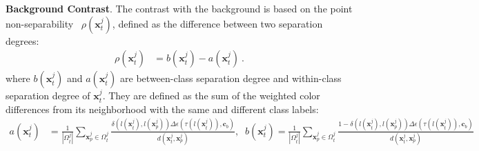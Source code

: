 %
%


\vspace{2mm}
\noindent\textbf{Background Contrast}.
The contrast with the background is based on the point non-separability~\cite{Wang2018} $\rho (\mathbf{x}^j_t)$, defined as the difference between two  separation degrees: 
\begin{align}
\rho(\mathbf{x}^j_t)&= b(\mathbf{x}^j_t)-a(\mathbf{x}^j_t) \ .
\end{align}
where $b(\mathbf{x}^j_t)$ and $a(\mathbf{x}^j_t)$ are between-class separation degree and within-class separation degree  of $\mathbf{x}^j_t$. They are defined as the sum of the weighted color differences from its neighborhood with the same and different class labels:
\begin{align}
a(\mathbf{x}^j_t)&=\frac{1}{|\Omega^j_t|}\sum_{\mathbf{x}^j_p \in \Omega^j_t } \frac{\delta(l(\mathbf{x}^j_t), l(\mathbf{x}^j_p)) 
\Delta\epsilon(\tau(l(\mathbf{x}^j_t)),\mathbf{c}_b)
}{d(\mathbf{x}^j_t,\mathbf{x}^j_p)} , \;\;
b(\mathbf{x}^j_t)=\frac{1}{|\Omega^j_t|}\sum_{\mathbf{x}^j_p \in \Omega^j_t } \frac{1-\delta(l(\mathbf{x}^j_t), l(\mathbf{x}^j_p))\Delta\epsilon(\tau(l(\mathbf{x}^j_t)),\mathbf{c}_b)}{d(\mathbf{x}^j_t,\mathbf{x}^j_p)}  \nonumber
\end{align}


